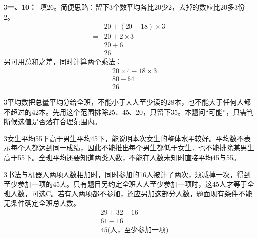 \documentclass[multi=snippet,border={5bp 20bp 5bp 5bp}]{standalone}
\newenvironment{snippet}[3]{\begin{minipage}{#1bp}\color{answerred}\fontsize{#2}{#3}\selectfont\raggedright}{\end{minipage}}
\begin{document}
\begin{snippet}{505}{11.5}{14}\begin{multicols}{3}\raggedcolumns \textbf{一、10：}\ 填\(26\)\allowbreak 。简便思路：留下3个数平均各比20少2，去掉的数应比20多3份2。\[\begin{aligned}&20+(20-18)\times3\\={}&20+2\times3\\={}&20+6\\={}&26\end{aligned}\]另可用总和之差，同时计算两个乘法：\[\begin{aligned}&20\times4-18\times3\\={}&80-54\\={}&26\end{aligned}\]\end{multicols}\end{snippet}
\begin{snippet}{505}{11.5}{14}\begin{multicols}{3}\raggedcolumns 平均数把总量平均分给全班，不能小于人人至少读的28本，也不能大于任何人都不超过的42本。先用这个范围排除25、45、20，只留下35。本题问“可能”，只需判断候选值是否落在合理范围内。\end{multicols}\end{snippet}
\begin{snippet}{505}{11.5}{14}\begin{multicols}{3}\raggedcolumns 女生平均55下高于男生平均45下，能说明本次女生的整体水平较好。平均数不表示每个人都达到同一成绩，因此不能推出每个男生都低于女生，也不能排除某男生高于55下。全班平均还要知道两类人数，不能在人数未知时直接平均45与55。\end{multicols}\end{snippet}
\begin{snippet}{505}{11.5}{14}\begin{multicols}{3}\raggedcolumns 书法与机器人两项人数相加时，同时参加的16人被计了两次，须减掉一次，得到至少参加一项的45人。只有题目另约定全班人人至少参加一项时，这45人才等于全班人数，可选C。若有人两项都不参加，还应另加这部分人数，题面现有条件不能无条件确定全班总人数。\[\begin{aligned}&29+32-16\\={}&61-16\\={}&45\text{(人，至少参加一项)}\end{aligned}\]\end{multicols}\end{snippet}
\end{document}
